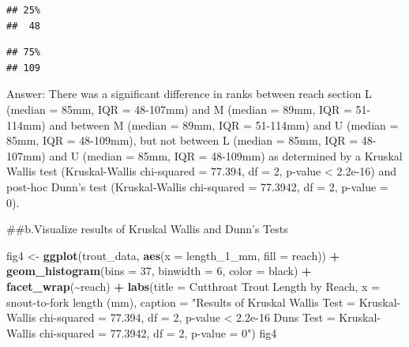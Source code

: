 \documentclass[
]{article}
\newenvironment{Shaded}{\begin{snugshade}}{\end{snugshade}}
\newcommand{\AttributeTok}[1]{\textcolor[rgb]{0.13,0.29,0.53}{#1}}
\newcommand{\ConstantTok}[1]{\textcolor[rgb]{0.56,0.35,0.01}{#1}}
\newcommand{\DecValTok}[1]{\textcolor[rgb]{0.00,0.00,0.81}{#1}}
\newcommand{\FloatTok}[1]{\textcolor[rgb]{0.00,0.00,0.81}{#1}}
\newcommand{\FunctionTok}[1]{\textcolor[rgb]{0.13,0.29,0.53}{\textbf{#1}}}
\newcommand{\NormalTok}[1]{#1}
\newcommand{\OtherTok}[1]{\textcolor[rgb]{0.56,0.35,0.01}{#1}}
\newcommand{\SpecialCharTok}[1]{\textcolor[rgb]{0.81,0.36,0.00}{\textbf{#1}}}
\newcommand{\StringTok}[1]{\textcolor[rgb]{0.31,0.60,0.02}{#1}}
\begin{document}
\begin{verbatim}
## 25% 
##  48
\end{verbatim}

\begin{Shaded}
\end{Shaded}

\begin{verbatim}
## 75% 
## 109
\end{verbatim}

Answer: There was a significant difference in ranks between reach
section L (median = 85mm, IQR = 48-107mm) and M (median = 89mm, IQR =
51-114mm) and between M (median = 89mm, IQR = 51-114mm) and U (median =
85mm, IQR = 48-109mm), but not between L (median = 85mm, IQR = 48-107mm)
and U (median = 85mm, IQR = 48-109mm) as determined by a Kruskal Wallis
test (Kruskal-Wallis chi-squared = 77.394, df = 2, p-value \textless{}
2.2e-16) and post-hoc Dunn's test (Kruskal-Wallis chi-squared = 77.3942,
df = 2, p-value = 0).

\#\#b.Visualize results of Kruskal Wallis and Dunn's Tests

\begin{Shaded}
\begin{Highlighting}[]
\NormalTok{fig4 }\OtherTok{\textless{}{-}} \FunctionTok{ggplot}\NormalTok{(trout\_data, }\FunctionTok{aes}\NormalTok{(}\AttributeTok{x =}\NormalTok{ length\_1\_mm, }\AttributeTok{fill =}\NormalTok{ reach)) }\SpecialCharTok{+}
  \FunctionTok{geom\_histogram}\NormalTok{(}\AttributeTok{bins =} \DecValTok{37}\NormalTok{, }\AttributeTok{binwidth =} \DecValTok{6}\NormalTok{, }\AttributeTok{color =} \StringTok{\textquotesingle{}black\textquotesingle{}}\NormalTok{) }\SpecialCharTok{+}
  \FunctionTok{facet\_wrap}\NormalTok{(}\SpecialCharTok{\textasciitilde{}}\NormalTok{reach) }\SpecialCharTok{+}
  \FunctionTok{labs}\NormalTok{(}\AttributeTok{title =} \StringTok{\textquotesingle{}Cutthroat Trout Length by Reach\textquotesingle{}}\NormalTok{, }
       \AttributeTok{x =} \StringTok{\textquotesingle{}snout{-}to{-}fork length (mm)\textquotesingle{}}\NormalTok{,}
       \AttributeTok{caption =} \StringTok{"Results of Kruskal Wallis Test = Kruskal{-}Wallis chi{-}squared = 77.394, df = 2, p{-}value \textless{} 2.2e{-}16}
\StringTok{Dun\textquotesingle{}s Test = Kruskal{-}Wallis chi{-}squared = 77.3942, df = 2, p{-}value = 0"}\NormalTok{)}
\NormalTok{fig4}
\end{Highlighting}
\end{Shaded}
\end{document}
